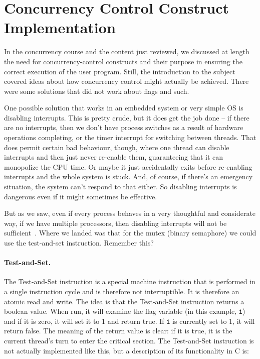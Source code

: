 





\section*{Concurrency Control Construct Implementation}
In the concurrency course and the content just reviewed, we discussed at length the need for concurrency-control constructs and their purpose in ensuring the correct execution of the user program. Still, the introduction to the subject covered ideas about how concurrency control might actually be achieved. There were some solutions that did not work about flags and such.

One possible solution that works in an embedded system or very simple OS is disabling interrupts. This is pretty crude, but it does get the job done -- if there are no interrupts, then we don't have process switches as a result of hardware operations completing, or the timer interrupt for switching between threads. That does permit certain bad behaviour, though, where one thread can disable interrupts and then just never re-enable them, guaranteeing that it can monopolize the CPU time. Or maybe it just accidentally exits before re-enabling interrupts and the whole system is stuck. And, of course, if there's an emergency situation, the system can't respond to that either. So disabling interrupts is dangerous even if it might sometimes be effective.

But as we saw, even if every process behaves in a very thoughtful and considerate way, if we have multiple processors, then disabling interrupts will not be sufficient~\cite{osi}. Where we landed was that for the mutex (binary semaphore) we could use the test-and-set instruction. Remember this?

\paragraph{Test-and-Set.}
The Test-and-Set instruction is a special machine instruction that is performed in a single instruction cycle and is therefore not interruptible. It is therefore an atomic read and write. The idea is that the Test-and-Set instruction returns a boolean value. When run, it will examine the flag variable (in this example, \texttt{i}) and if it is zero, it will set it to 1 and return true. If \texttt{i} is currently set to 1, it will return false. The meaning of the return value is clear: if it is true, it is the current thread's turn to enter the critical section. The Test-and-Set instruction is not actually implemented like this, but a description of its functionality in C is:

